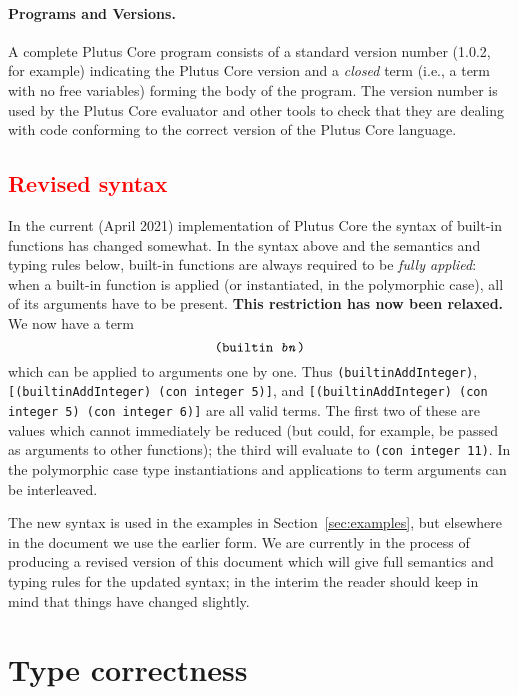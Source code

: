 \documentclass[a4paper]{article}
\newcommand{\red}[1]{\textcolor{red}{#1}}
\begin{document}
\paragraph{Programs and Versions.} A complete Plutus Core program
consists of a standard version number (1.0.2, for example) indicating
the Plutus Core version and a \textit{closed} term (i.e., a term with no
free variables) forming the body of the program.  The version number
is used by the Plutus Core evaluator and other tools to check that
they are dealing with code conforming to the correct version of the
Plutus Core language.

\red{\subsection{Revised syntax}}
\label{sec:syntax-update}
\noindent In the current (April 2021) implementation of Plutus Core the syntax of built-in
functions has changed somewhat.  In the syntax above and the semantics and
typing rules below, built-in functions are always required to be \textit{fully
applied}: when a built-in function is applied (or instantiated, in the
polymorphic case), all of its arguments have to be present.  \textbf{This
restriction has now been relaxed.}  We now have a term
\\
$$
   \texttt{(builtin \textit{bn})}
$$
\noindent
which can be applied to arguments one by
one. Thus \texttt{(builtinAddInteger)}, \texttt{[(builtinAddInteger) (con
integer 5)]}, and \texttt{[(builtinAddInteger) (con integer 5) (con integer 6)]}
are all valid terms.  The first two of these are values which cannot immediately
be reduced (but could, for example, be passed as arguments to other functions);
the third will evaluate to \texttt{(con integer 11)}.  In the polymorphic
case type instantiations and applications to term arguments can be interleaved.

The new syntax is used in the examples in Section~\ref{sec:examples}, but
elsewhere in the document we use the earlier form.  We are currently in the
process of producing a revised version of this document which will give full
semantics and typing rules for the updated syntax; in the interim the reader
should keep in mind that things have changed slightly.

\section{Type correctness}
\end{document}
